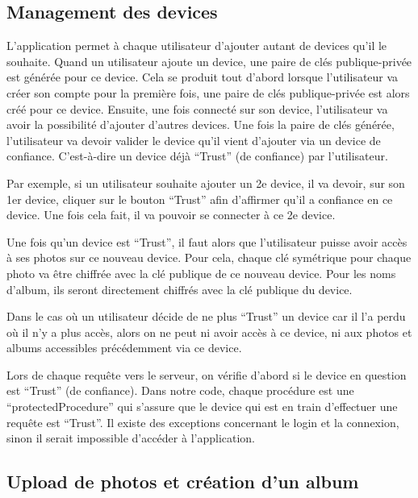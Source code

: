 \documentclass[
  11pt,
  paper=a4,
  ,captions=tableheading
]{scrartcl}
\begin{document}
\newpage

\hypertarget{management-des-devices}{%
\subsection{Management des devices}\label{management-des-devices}}

L’application permet à chaque utilisateur d’ajouter autant de devices
qu’il le souhaite. Quand un utilisateur ajoute un device, une paire de
clés publique-privée est générée pour ce device. Cela se produit tout
d’abord lorsque l’utilisateur va créer son compte pour la première fois,
une paire de clés publique-privée est alors créé pour ce device.
Ensuite, une fois connecté sur son device, l’utilisateur va avoir la
possibilité d’ajouter d’autres devices. Une fois la paire de clés
générée, l’utilisateur va devoir valider le device qu’il vient d’ajouter
via un device de confiance. C’est-à-dire un device déjà “Trust” (de
confiance) par l’utilisateur.

Par exemple, si un utilisateur souhaite ajouter un 2e device, il va
devoir, sur son 1er device, cliquer sur le bouton “Trust” afin
d’affirmer qu’il a confiance en ce device. Une fois cela fait, il va
pouvoir se connecter à ce 2e device.

Une fois qu’un device est “Trust”, il faut alors que l’utilisateur
puisse avoir accès à ses photos sur ce nouveau device. Pour cela, chaque
clé symétrique pour chaque photo va être chiffrée avec la clé publique
de ce nouveau device. Pour les noms d’album, ils seront directement
chiffrés avec la clé publique du device.

Dans le cas où un utilisateur décide de ne plus “Trust” un device car il
l’a perdu où il n’y a plus accès, alors on ne peut ni avoir accès à ce
device, ni aux photos et albums accessibles précédemment via ce device.

Lors de chaque requête vers le serveur, on vérifie d’abord si le device
en question est “Trust” (de confiance). Dans notre code, chaque
procédure est une “protectedProcedure” qui s’assure que le device qui
est en train d’effectuer une requête est “Trust”. Il existe des
exceptions concernant le login et la connexion, sinon il serait
impossible d’accéder à l’application.

\newpage

\hypertarget{upload-de-photos-et-cruxe9ation-dun-album}{%
\subsection{Upload de photos et création d’un
album}\label{upload-de-photos-et-cruxe9ation-dun-album}}
\end{document}
